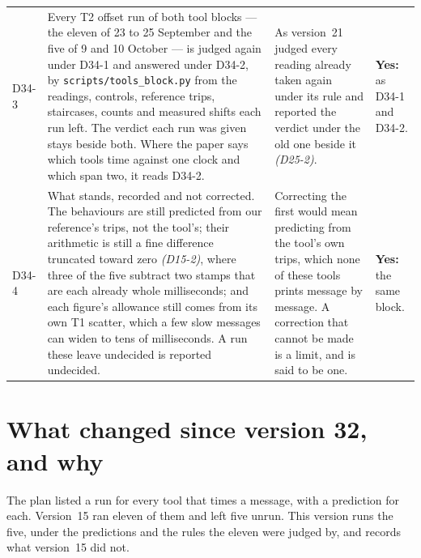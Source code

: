 \documentclass[11pt]{article}
\newcommand{\gl}[1]{{\color{soft}\itshape\small (#1)}}
\begin{document}
{\begin{longtable}{@{}p{1.1cm} >{\raggedright\arraybackslash}p{6.1cm} >{\raggedright\arraybackslash}p{6.0cm} >{\raggedright\arraybackslash}p{2.2cm}@{}}
D34-3 & Every T2 offset run of both tool blocks --- the eleven of 23 to 25 September and the five of 9 and 10 October --- is judged again under D34-1 and answered under D34-2, by \texttt{scripts/tools\_block.py} from the readings, controls, reference trips, staircases, counts and measured shifts each run left. The verdict each run was given stays beside both. Where the paper says which tools time against one clock and which span two, it reads D34-2. & As version~21 judged every reading already taken again under its rule and reported the verdict under the old one beside it \gl{D25-2}. & \textbf{Yes:} as D34-1 and D34-2. \\
D34-4 & What stands, recorded and not corrected. The behaviours are still predicted from our reference's trips, not the tool's; their arithmetic is still a fine difference truncated toward zero \gl{D15-2}, where three of the five subtract two stamps that are each already whole milliseconds; and each figure's allowance still comes from its own T1 scatter, which a few slow messages can widen to tens of milliseconds. A run these leave undecided is reported undecided. & Correcting the first would mean predicting from the tool's own trips, which none of these tools prints message by message. A correction that cannot be made is a limit, and is said to be one. & \textbf{Yes:} the same block. \\
\bottomrule
\end{longtable}}

\section*{What changed since version 32, and why}
The plan listed a run for every tool that times a message, with a prediction for each. Version~15
ran eleven of them and left five unrun. This version runs the five, under the predictions and the
rules the eleven were judged by, and records what version~15 did not.
\end{document}
